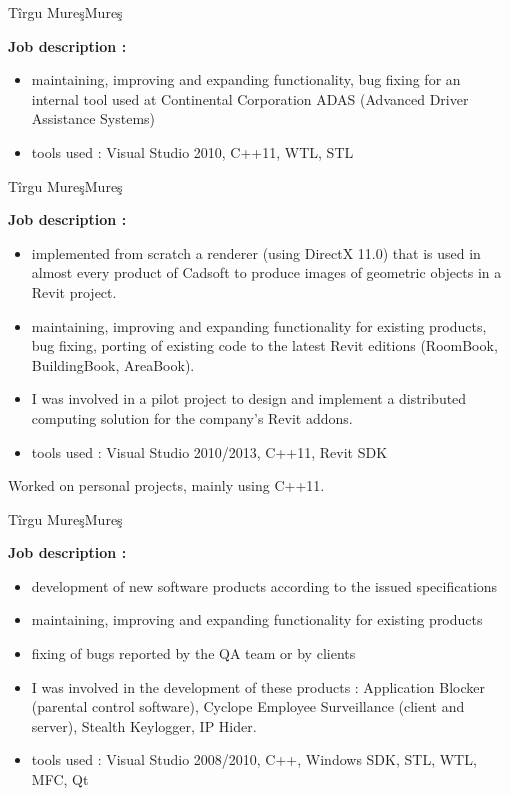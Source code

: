 \documentclass[14pt,a4paper,sans]{moderncv}   %
\begin{document}
 {T\^{i}rgu Mure\c{s}}{Mure\c{s}}{
\textbf{Job description :}
\begin{itemize}
\item maintaining, improving and expanding functionality, bug fixing for 
an internal tool used at 
Continental Corporation ADAS (Advanced Driver Assistance Systems)
\item tools used : Visual Studio 2010, C++11, WTL, STL
\end{itemize}}

{T\^{i}rgu Mure\c{s}}{Mure\c{s}}{
\textbf{Job description :}
\begin{itemize}
\item implemented from scratch a renderer (using DirectX 11.0) that is used in
almost every product of Cadsoft to produce images of geometric objects in a Revit
project.
\item maintaining, improving and expanding functionality for existing products,
bug fixing, porting of existing code to the latest Revit editions (RoomBook,
BuildingBook, AreaBook).
\item I was involved in a pilot project to design and implement a
distributed computing solution for the company's Revit addons.
\item tools used : Visual Studio 2010/2013, C++11, Revit SDK
\end{itemize}}

 {}{Worked on personal projects, mainly
using C++11.}{}

{T\^{i}rgu Mure\c{s}}{Mure\c{s}}{
\textbf{Job description :}
\begin{itemize}
\item development of new software products according to the issued specifications
\item maintaining, improving and expanding functionality for existing products
\item fixing of bugs reported by the QA team or by clients
\item I was involved in the development of these products : 
    Application Blocker (parental control software), 
    Cyclope Employee Surveillance (client and server), 
    Stealth Keylogger, IP Hider.
\item tools used : Visual Studio 2008/2010, C++, Windows SDK, STL, WTL, MFC, Qt
\end{itemize}}
\end{document}
